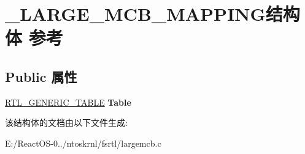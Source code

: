 \hypertarget{struct___l_a_r_g_e___m_c_b___m_a_p_p_i_n_g}{}\section{\+\_\+\+L\+A\+R\+G\+E\+\_\+\+M\+C\+B\+\_\+\+M\+A\+P\+P\+I\+N\+G结构体 参考}
\label{struct___l_a_r_g_e___m_c_b___m_a_p_p_i_n_g}
\subsection*{Public 属性}
\begin{DoxyCompactItemize}
\item 
\mbox{\label{struct___l_a_r_g_e___m_c_b___m_a_p_p_i_n_g_a582db5016e4cc55415e5452379ec8a12}} 
\hyperlink{struct___r_t_l___g_e_n_e_r_i_c___t_a_b_l_e}{R\+T\+L\+\_\+\+G\+E\+N\+E\+R\+I\+C\+\_\+\+T\+A\+B\+LE} {\bfseries Table}
\end{DoxyCompactItemize}


该结构体的文档由以下文件生成\+:\begin{DoxyCompactItemize}
\item 
E\+:/\+React\+O\+S-\/0../ntoskrnl/fsrtl/largemcb.\+c\end{DoxyCompactItemize}
